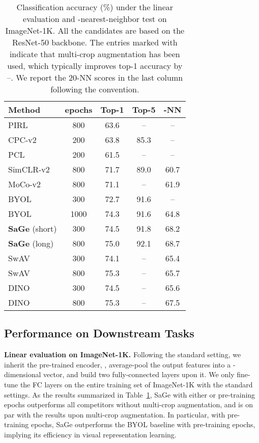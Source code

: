 \documentclass[10pt,twocolumn,letterpaper]{article}
\begin{document}
\begin{table}[!t]
\fontsize{9.5}{11.0}\selectfont
\centering
\setlength{\tabcolsep}{2.5mm}
\begin{tabular}{l|c|cc|c}
\toprule
Method   & epochs  & Top-1  & Top-5 & -NN \\
\midrule
PIRL~\cite{misra2020self} &800&63.6 &--&--\\
CPC-v2~\cite{henaff2019data}&200&63.8  &85.3&--\\
PCL~\cite{li2020prototypical}&200 &61.5 &--&--\\
SimCLR-v2~\cite{chen2020big} &800&71.7  &89.0&60.7\\
MoCo-v2~\cite{chen2020improved} &800 &71.1 &--&61.9\\
BYOL~\cite{grill2020bootstrap} &300 &72.7  &91.6&--\\
BYOL~\cite{grill2020bootstrap} &1000 &74.3  &91.6&64.8\\
\midrule
\textbf{SaGe} (short)  &300  &74.5  &91.8  &68.2\\
\textbf{SaGe} (long)  &800  &75.0  &92.1 & 68.7\\
\midrule
SwAV~\cite{caron2020unsupervised} &300 &74.1 &-- &65.4\\
SwAV~\cite{caron2020unsupervised} &800 &75.3 &-- &65.7\\
DINO~\cite{caron2021emerging}  &300  &74.5 &-- &65.6\\
DINO~\cite{caron2021emerging}  &800 &75.3 &-- &67.5\\
\bottomrule
\end{tabular}
\caption{Classification accuracy (\%) under the linear evaluation and -nearest-neighbor test on ImageNet-1K. All the candidates are based on the ResNet-50 backbone. The entries marked with  indicate that multi-crop augmentation has been used, which typically improves top-1 accuracy by --. We report the 20-NN scores in the last column following the convention.}
\label{tab:lincls_imagenet1K}
\end{table}

\subsection{Performance on Downstream Tasks}

\noindent
\hspace{0.2cm}\textbf{Linear evaluation on ImageNet-1K.} Following the standard setting, we inherit the pre-trained encoder, , average-pool the output features into a -dimensional vector, and build two fully-connected layers upon it. We only fine-tune the FC layers on the entire training set of ImageNet-1K with the standard settings. As the results summarized in Table~\ref{tab:lincls_imagenet1K}, SaGe with either  or  pre-training epochs outperforms all competitors without multi-crop augmentation, and is on par with the results upon multi-crop augmentation. In particular, with  pre-training epochs, SaGe outperforms the BYOL baseline with  pre-training epochs, implying its efficiency in visual representation learning.
\end{document}
